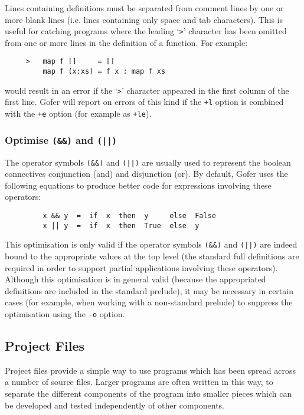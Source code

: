 \IT Lines containing definitions must be separated from comment lines
     by one or more blank lines (i.e. lines containing only space and
     tab characters).  This is useful for catching programs where the
     leading `\verb">"' character has been omitted from one or more lines in
     the definition of a function.  For example:
\begin{verbatim}
     >   map f []     = []
         map f (x:xs) = f x : map f xs
\end{verbatim}
     would result in an error if the `\verb">"' character appeared in the first
     column of the first line.
\EI
Gofer will report on errors of this kind if the \verb"+l" option is combined
with the \verb"+e" option (for example as \verb"+le").


\subsubsection{Optimise {\tt (\&\&)} and {\tt (||)}}
The operator symbols \verb"(&&)" and \verb"(||)" 
are usually used to represent the
boolean connectives conjunction (and) and disjunction (or).  By
default, Gofer uses the following equations to produce better code for
expressions involving these operators:
\begin{verbatim}
         x && y  =  if  x  then  y     else  False
         x || y  =  if  x  then  True  else  y
\end{verbatim}
This optimisation is only valid if the operator symbols \verb"(&&)" 
and \verb"(||)"
are indeed bound to the appropriate values at the top level (the
standard full definitions are required in order to support partial
applications involving these operators).  Although this optimisation is
in general valid (because the appropriated definitions are included in
the standard prelude), it may be necessary in certain cases (for
example, when working with a non-standard prelude) to suppress the
optimisation using the \verb"-o" option.



\subsection{Project Files}
Project files provide a simple way to use programs which has been
spread across a number of source files.  Larger programs are often
written in this way, to separate the different components of the
program into smaller pieces which can be developed and tested
independently of other components.

